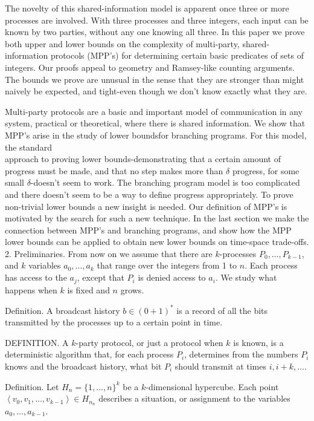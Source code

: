 \documentclass[10pt]{article}
\begin{document}
The novelty of this shared-information model is apparent once three or more processes are involved. With three processes and three integers, each input can be known by two parties, without any one knowing all three. In this paper we prove both upper and lower bounds on the complexity of multi-party, shared-information protocols (MPP's) for determining certain basic predicates of sets of integers. Our proofs appeal to geometry and Ramsey-like counting arguments. The bounds we prove are unusual in the sense that they are stronger than might naively be expected, and tight-even though we don't know exactly what they are.

Multi-party protocols are a basic and important model of communication in any system, practical or theoretical, where there is shared information. We show that MPP's arise in the study of lower boundsfor branching programs. For this model, the standard\\
approach to proving lower bounds-demonstrating that a certain amount of progress must be made, and that no step makes more than $\delta$ progress, for some small $\delta$-doesn't seem to work. The branching program model is too complicated and there doesn't seem to be a way to define progress appropriately. To prove non-trivial lower bounds a new insight is needed. Our definition of MPP's is motivated by the search for such a new technique. In the last section we make the connection between MPP's and branching programs, and show how the MPP lower bounds can be applied to obtain new lower bounds on time-space trade-offs.\\
2. Preliminaries. From now on we assume that there are $k$-processes $P_{0}, \ldots, P_{k-1}$, and $k$ variables $a_{0}, \ldots, a_{k}$ that range over the integers from 1 to $n$. Each process has access to the $a_{j}$, except that $P_{i}$ is denied access to $a_{i}$. We study what happens when $k$ is fixed and $n$ grows.

Definition. A broadcast history $b \in(0+1)^{*}$ is a record of all the bits transmitted by the processes up to a certain point in time.

DEFINITION. A $k$-party protocol, or just a protocol when $k$ is known, is a deterministic algorithm that, for each process $P_{i}$, determines from the numbers $P_{i}$ knows and the broadcast history, what bit $P_{i}$ should transmit at times $i, i+k, \ldots$.

Definition. Let $H_{n}=\{1, \ldots, n\}^{k}$ be a $k$-dimensional hypercube. Each point $\left\langle v_{0}, v_{1}, \ldots, v_{k-1}\right\rangle \in H_{n_{n}}$ describes a situation, or assignment to the variables $a_{0}, \ldots, a_{k-1}$.
\end{document}
